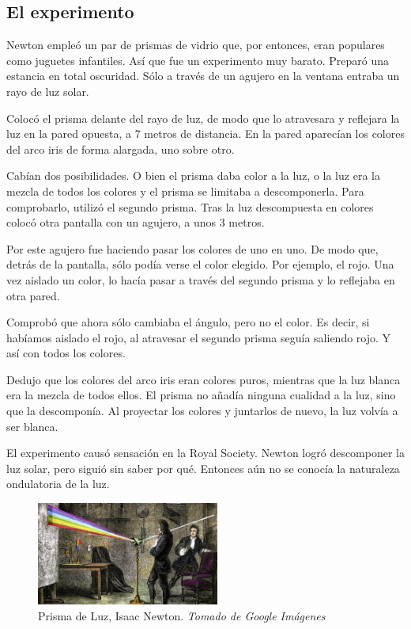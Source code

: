 \documentclass[journal]{IEEEtran}
\begin{document}
\subsection{El experimento}

Newton empleó un par de prismas de vidrio que, por entonces, eran populares como juguetes infantiles. Así que fue un experimento muy barato. Preparó una estancia en total oscuridad. Sólo a través de un agujero en la ventana entraba un rayo de luz solar. 

Colocó el prisma delante del rayo de luz, de modo que lo atravesara y reflejara la luz en la pared opuesta, a 7 metros de distancia. En la pared aparecían los colores del arco iris de forma alargada, uno sobre otro.

Cabían dos posibilidades. O bien el prisma daba color a la luz, o la luz era la mezcla de todos los colores y el prisma se limitaba a descomponerla. Para comprobarlo, utilizó el segundo prisma. Tras la luz descompuesta en colores colocó otra pantalla con un agujero, a unos 3 metros. 

Por este agujero fue haciendo pasar los colores de uno en uno. De modo que, detrás de la pantalla, sólo podía verse el color elegido. Por ejemplo, el rojo. Una vez aislado un color, lo hacía pasar a través del segundo prisma y lo reflejaba en otra pared.

Comprobó que ahora sólo cambiaba el ángulo, pero no el color. Es decir, si habíamos aislado el rojo, al atravesar el segundo prisma seguía saliendo rojo. Y así con todos los colores. 

Dedujo que los colores del arco iris eran colores puros, mientras que la luz blanca era la mezcla de todos ellos. El prisma no añadía ninguna cualidad a la luz, sino que la descomponía. Al proyectar los colores y juntarlos de nuevo, la luz volvía a ser blanca.

El experimento causó sensación en la Royal Society. Newton logró descomponer la luz solar, pero siguió sin saber por qué. Entonces aún no se conocía la naturaleza ondulatoria de la luz.

\begin{center}
  \begin{figure}[h!]
  \includegraphics[width=60mm]{prisma_newton.jpg}
  \caption{Prisma de Luz, Isaac Newton. \emph{Tomado de Google Imágenes}}
  \end{figure}
\end{center}
\end{document}

